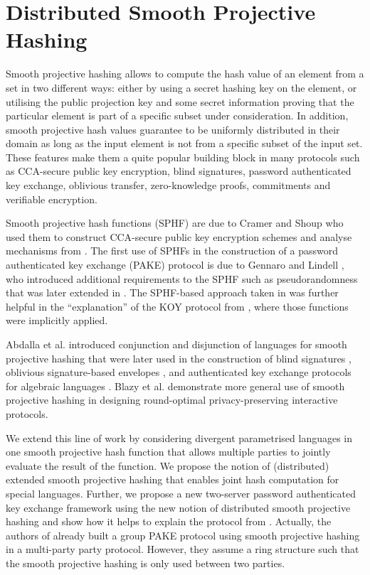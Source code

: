 \section{Distributed Smooth Projective Hashing}

Smooth projective hashing allows to compute the hash value of an element from a set in two different ways:
either by using a secret hashing key on the element, or utilising the public projection key and some secret information proving that the particular element is part of a specific subset under consideration.
In addition, smooth projective hash values guarantee to be uniformly distributed in their domain as long as the input element is not from a specific subset of the input set.
These features make them a quite popular building block in many protocols such as CCA-secure public key encryption, blind signatures, password authenticated key exchange, oblivious transfer, zero-knowledge proofs, commitments and verifiable encryption.

Smooth projective hash functions (SPHF) are due to Cramer and Shoup \cite{Cramer2002} who used them to construct CCA-secure public key encryption schemes and analyse mechanisms from \cite{Cramer_Shoup_1998}.
The first use of SPHFs in the construction of a password authenticated key exchange (PAKE) protocol is due to Gennaro and Lindell \cite{Gennaro2003}, who introduced additional requirements to the SPHF such as pseudorandomness that was later extended in \cite{Katz2011}.
The SPHF-based approach taken in \cite{Gennaro2003} was further helpful in the ``explanation'' of the KOY protocol from \cite{Katz_Ostrovsky_Yung_2001}, where those functions were implicitly applied.

Abdalla et al. \cite{Abdalla2009} introduced conjunction and disjunction of languages for smooth projective hashing that were later used in the construction of blind signatures \cite{Blazy2012,cryptoeprint:2013:034}, oblivious signature-based envelopes \cite{Blazy2012}, and authenticated key exchange protocols for algebraic languages \cite{Hamouda2013}.
Blazy et al. \cite{Blazy2012} demonstrate more general use of smooth projective hashing in designing round-optimal privacy-preserving interactive protocols.

We extend this line of work by %
considering divergent parametrised languages in one smooth projective hash function that allows multiple parties to jointly evaluate the result of the function. %
We propose the notion of (distributed) extended smooth projective hashing that enables joint hash computation for special languages.
Further, we propose a new two-server password authenticated key exchange framework using the new notion of distributed smooth projective hashing and show how it helps to explain the protocol from \cite{Katz_MacKenzie_Taban_Gligor_2005}.
Actually, the authors of \cite{AbdallaP06} already built a group PAKE protocol using smooth projective hashing in a multi-party party protocol.
However, they assume a ring structure such that the smooth projective hashing is only used between two parties.


